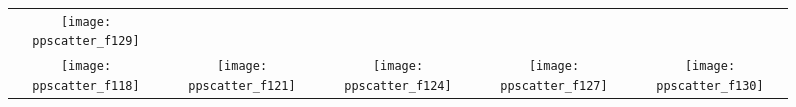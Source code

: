 \documentclass{article}
\newcommand{\ERT}{\ensuremath{\mathrm{ERT}}}
\begin{document}
\begin{figure}
\begin{tabular}{*{5}{@{}c@{}}}
    \texttt{[image: ppscatter\_f129]}\\
    \texttt{[image: ppscatter\_f118]}&
    \texttt{[image: ppscatter\_f121]}&
    \texttt{[image: ppscatter\_f124]}&
    \texttt{[image: ppscatter\_f127]}&
    \texttt{[image: ppscatter\_f130]}
\end{tabular}
\caption{\label{fig:scatterplots}
}
\end{figure}
\end{document}

